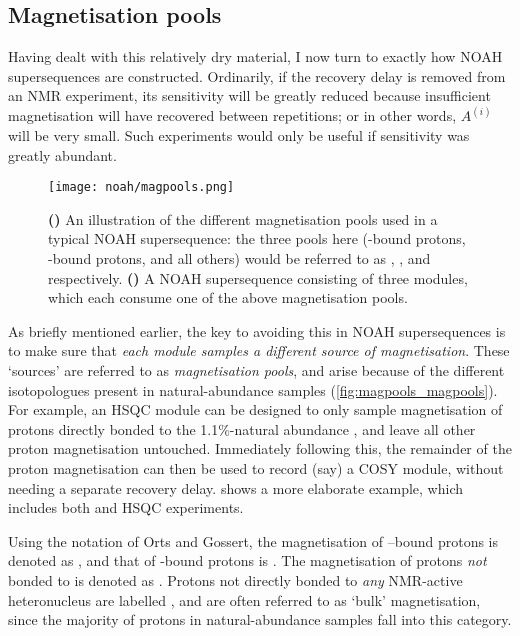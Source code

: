 \subsection{Magnetisation pools}
\label{subsec:noah__magpools}

Having dealt with this relatively dry material, I now turn to exactly how NOAH supersequences are constructed.
Ordinarily, if the recovery delay is removed from an NMR experiment, its sensitivity will be greatly reduced because insufficient magnetisation will have recovered between repetitions; or in other words, $A^{(i)}$ will be very small.
Such experiments would only be useful if sensitivity was greatly abundant.

\begin{figure}[!ht]
    \centering
    \texttt{[image: noah/magpools.png]}%
    {\label{fig:magpools_magpools}}%
    {\label{fig:magpools_sequences}}%
    \caption[Different magnetisation pools used in a typical NOAH supersequence]{
        \textbf{()} An illustration of the different magnetisation pools used in a typical NOAH supersequence: the three pools here (\nitrogen{}-bound protons, \carbon{}-bound protons, and all others) would be referred to as , , and  respectively.
        \textbf{()} A NOAH supersequence consisting of three modules, which each consume one of the above magnetisation pools.
    }
    \label{fig:magpools}
\end{figure}

As briefly mentioned earlier, the key to avoiding this in NOAH supersequences is to make sure that \textit{each module samples a different source of magnetisation}.
These `sources' are referred to as \textit{magnetisation pools}, and arise because of the different isotopologues present in natural-abundance samples (\cref{fig:magpools_magpools}).
For example, an HSQC module can be designed to only sample magnetisation of protons directly bonded to the 1.1\%-natural abundance \carbon{}, and leave all other proton magnetisation untouched.
Immediately following this, the remainder of the proton magnetisation can then be used to record (say) a COSY module, without needing a separate recovery delay.
 shows a more elaborate example, which includes both \nitrogen{} and \carbon{} HSQC experiments.

Using the notation of Orts and Gossert\autocite{Orts2018M}, the magnetisation of \carbon{}--bound protons is denoted as , and that of \nitrogen{}-bound protons is .
The magnetisation of protons \textit{not} bonded to \carbon{} is denoted as .
Protons not directly bonded to \textit{any} NMR-active heteronucleus are labelled , and are often referred to as `bulk' magnetisation, since the majority of protons in natural-abundance samples fall into this category.

